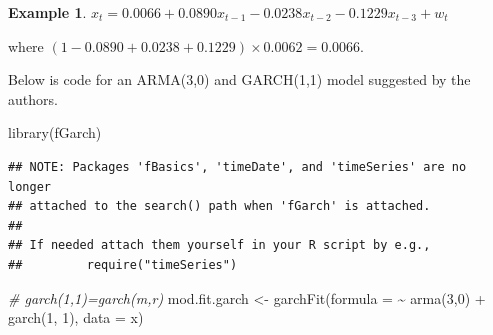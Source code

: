 \documentclass[
]{book}
\newenvironment{Shaded}{\begin{snugshade}}{\end{snugshade}}
\newcommand{\AttributeTok}[1]{\textcolor[rgb]{0.77,0.63,0.00}{#1}}
\newcommand{\CommentTok}[1]{\textcolor[rgb]{0.56,0.35,0.01}{\textit{#1}}}
\newcommand{\DecValTok}[1]{\textcolor[rgb]{0.00,0.00,0.81}{#1}}
\newcommand{\FunctionTok}[1]{\textcolor[rgb]{0.00,0.00,0.00}{#1}}
\newcommand{\NormalTok}[1]{#1}
\newcommand{\OtherTok}[1]{\textcolor[rgb]{0.56,0.35,0.01}{#1}}
\newcommand{\SpecialCharTok}[1]{\textcolor[rgb]{0.00,0.00,0.00}{#1}}
\theoremstyle{definition}
\theoremstyle{definition}
\newtheorem{example}{Example}[chapter]
\theoremstyle{definition}
\theoremstyle{definition}
\theoremstyle{remark}
\begin{document}
\begin{example}
\(x_t= 0.0066 + 0.0890x_{t-1} - 0.0238x_{t-2} - 0.1229x_{t-3} + w_t\)

where \((1-0.0890+0.0238+0.1229)\times 0.0062 = 0.0066.\)

Below is code for an ARMA(3,0) and GARCH(1,1) model suggested by the authors.

\begin{Shaded}
\begin{Highlighting}[]
\FunctionTok{library}\NormalTok{(fGarch)}
\end{Highlighting}
\end{Shaded}

\begin{verbatim}
## NOTE: Packages 'fBasics', 'timeDate', and 'timeSeries' are no longer
## attached to the search() path when 'fGarch' is attached.
## 
## If needed attach them yourself in your R script by e.g.,
##         require("timeSeries")
\end{verbatim}

\begin{Shaded}
\begin{Highlighting}[]
\CommentTok{\# garch(1,1)=garch(m,r)}
\NormalTok{mod.fit.garch }\OtherTok{\textless{}{-}} \FunctionTok{garchFit}\NormalTok{(}\AttributeTok{formula =} \SpecialCharTok{\textasciitilde{}} \FunctionTok{arma}\NormalTok{(}\DecValTok{3}\NormalTok{,}\DecValTok{0}\NormalTok{) }\SpecialCharTok{+} 
    \FunctionTok{garch}\NormalTok{(}\DecValTok{1}\NormalTok{, }\DecValTok{1}\NormalTok{), }\AttributeTok{data =}\NormalTok{ x)}
\end{Highlighting}
\end{Shaded}


\end{example}
\end{document}
